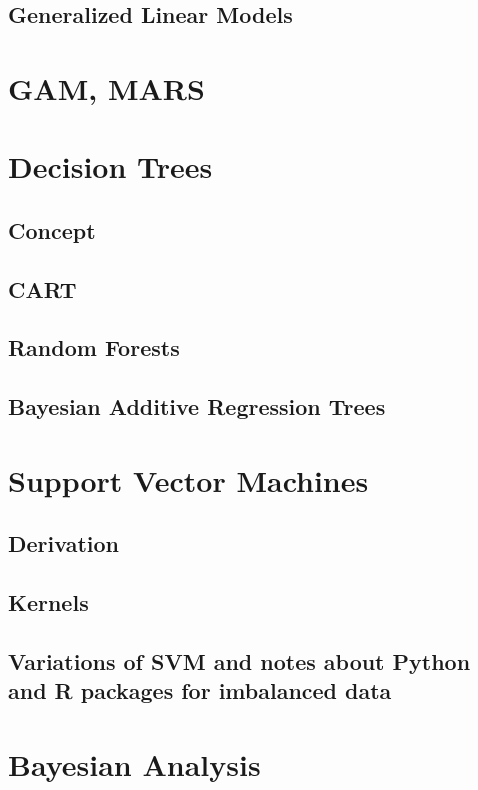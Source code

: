 \documentclass[12pt]{article}
\begin{document}
\subsection{Generalized Linear Models}

\newpage

\section{GAM, MARS}

\newpage


\section{Decision Trees}
\subsection{Concept}
\subsection{CART}
\subsection{Random Forests}
\subsection{Bayesian Additive Regression Trees}

\newpage

\section{Support Vector Machines}
\subsection{Derivation}
\subsection{Kernels}
\subsection{Variations of SVM and notes about Python and R packages for imbalanced data}

\newpage

\section{Bayesian Analysis}
\end{document}
